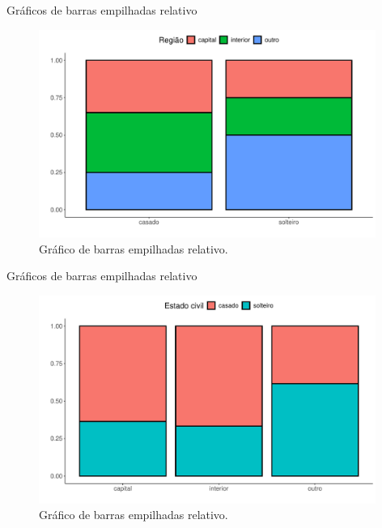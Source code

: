 \documentclass[
  ignorenonframetext,
  serif,
  professionalfont,
  usenames,
  dvipsnames,
  aspectratio = 169]{beamer}
\begin{document}
\begin{frame}{Gráficos de barras empilhadas relativo}
\label{gruxe1ficos-de-barras-empilhadas-relativo}
\begin{figure}

{\centering \includegraphics[width=11cm]{encontro2_files/figure-beamer/unnamed-chunk-28-1} 

}

\caption{Gráfico de barras empilhadas relativo.}\label{fig:unnamed-chunk-28}
\end{figure}
\end{frame}

\begin{frame}{Gráficos de barras empilhadas relativo}
\label{gruxe1ficos-de-barras-empilhadas-relativo-1}
\begin{figure}

{\centering \includegraphics[width=11cm]{encontro2_files/figure-beamer/unnamed-chunk-29-1} 

}

\caption{Gráfico de barras empilhadas relativo.}\label{fig:unnamed-chunk-29}
\end{figure}
\end{frame}
\end{document}
